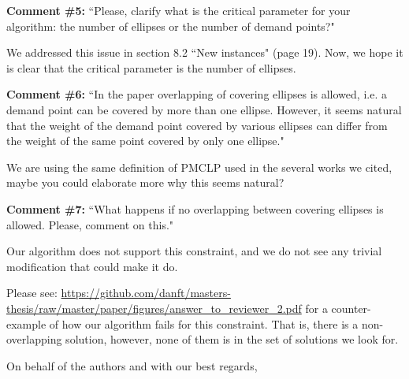 \documentclass[letterpaper]{letter}
\begin{document}
\begin{letter}{}
		\textbf{Comment \#5:} ``Please, clarify what is the critical parameter for your algorithm: the number of ellipses or the number of demand points?"
		
		We addressed this issue in section 8.2 ``New instances" (page 19). Now, we hope it is clear that the critical parameter is the number of ellipses.
		
		\textbf{Comment \#6:} ``In the paper overlapping of covering ellipses is allowed, i.e. a demand point can be covered by more than one ellipse. However, it seems natural that the weight of the demand point covered by various ellipses can differ from the weight of the same point covered by only one ellipse."
		
		We are using the same definition of PMCLP used in the several works we cited, maybe you could elaborate more why this seems natural?
		
		\textbf{Comment \#7:} ``What happens if no overlapping between covering ellipses is allowed. Please, comment on this."
		
		Our algorithm does not support this constraint, and we do not see any trivial modification that could make it do.
		
		Please see: \href{"https://github.com/danft/masters-thesis/raw/master/paper/figures/answer_to_reviewer_2.pdf"}{https://github.com/danft/masters-thesis/raw/master/paper/figures/answer_to_reviewer_2.pdf} for a counter-example of how our algorithm fails for this constraint. That is, there is a non-overlapping solution, however, none of them is in the set of solutions we look for.
		
		\closing{On behalf of the authors and with our best regards,}
			\end{letter}
		
\end{document}
